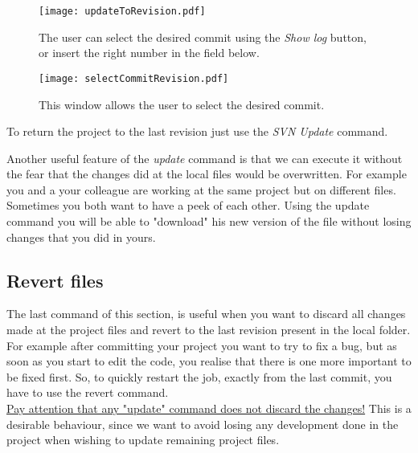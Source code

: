 \begin{figure}[htbp]
    \centering
    \texttt{[image: updateToRevision.pdf]}
    \caption{The user can select the desired commit using the \textit{Show log} button, or insert the right number in the field below.}
    \label{fig:updateToRevision}
\end{figure}





\begin{figure}[ht!]
    \centering
    \texttt{[image: selectCommitRevision.pdf]}
    \caption{This window allows the user to select the desired commit.}
    \label{fig:selectCommitRevision}
\end{figure}





To return the project to the last revision just use the \textit{SVN Update} command.

Another useful feature of the \textit{update} command is that we can execute it without the fear that the changes did at the local files would be overwritten. For example you and a your colleague are working at the same project but on different files.
Sometimes you both want to have a peek of each other. Using the update command you will be able to "download" his new version of the file without losing changes that you did in yours.








\subsection{Revert files}
\label{subsection:revertFiles}

The last command of this section, is useful when you want to discard all changes made at the project files and revert to the last revision present in the local folder.\\


For example after committing your project you want to try to fix a bug, but as soon as you start to edit the code, you realise that there is one more important to be fixed first. So, to quickly restart the job, exactly from the last commit, you have to use the revert command.\\


\underline{Pay attention that any "update" command does not discard the changes!} This is a desirable behaviour, since we want to avoid losing any development done in the project when wishing to update remaining project files.\\

